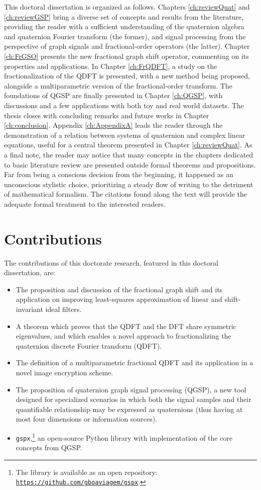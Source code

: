 This doctoral dissertation is organized as follows. Chapters \ref{ch:reviewQuat} and \ref{ch:reviewGSP} bring a diverse set of concepts and results from the literature, providing the reader with a sufficient understanding of the quaternion algebra and quaternion Fourier transform (the former), and signal processing from the perspective of graph signals and fractional-order operators (the latter).
Chapter \ref{ch:FrGSO} presents the new fractional graph shift operator, commenting on its properties and applications.
In Chapter \ref{ch:FrQDFT}, a study on the fractionalization of the QDFT is presented, with a new method being proposed, alongside a multiparametric version of the fractional-order transform.
The foundations of QGSP are finally presented in Chapter \ref{ch:QGSP}, with discussions and a few applications with both toy and real world datasets.
The thesis closes with concluding remarks and future works in Chapter \ref{ch:conclusion}. Appendix \ref{ch:AppendixA} leads the reader through the demonstration of a relation between systems of quaternion and complex linear equations, useful for a central theorem presented in Chapter \ref{ch:reviewQuat}. As a final note, the reader may notice that many concepts in the chapters dedicated to basic literature review are presented outside formal theorems and propositions. Far from being a conscious decision from the beginning, it happened as an unconscious stylistic choice, prioritizing a steady flow of writing to the detriment of mathematical formalism. The citations found along the text will provide the adequate formal treatment to the interested readers.

\section{Contributions}
The contributions of this doctorate research, featured in this doctoral dissertation, are:

\vspace{-1em}
\begin{itemize}[noitemsep]
    \item The proposition and discussion of the fractional graph shift and its application on improving least-squares approximation of linear and shift-invariant ideal filters.
    \item A theorem which proves that the QDFT and the DFT share symmetric eigenvalues, and which enables a novel approach to fractionalizing the quaternion discrete Fourier transform (QDFT).
    \item The definition of a multiparametric fractional QDFT and its application in a novel image encryption scheme.
    \item The proposition of quaternion graph signal processing (QGSP), a new tool designed for specialized scenarios in which both the signal samples and their quantifiable relationship may be expressed as quaternions (thus having at most four dimensions or information sources).
    \item \texttt{gspx},\footnote{The library is available as an open repository: \texttt{\url{https://github.com/gboaviagem/gspx}}.} an open-source Python library with implementation of the core concepts from QGSP.
\end{itemize}
\vspace{-1em}
